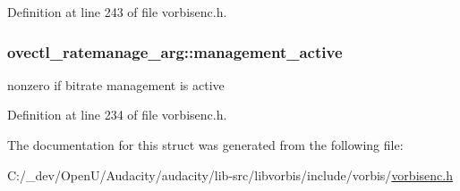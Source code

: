 Definition at line 243 of file vorbisenc.\+h.

\subsubsection[{\texorpdfstring{management\+\_\+active}{management_active}}]{ ovectl\+\_\+ratemanage\+\_\+arg\+::management\+\_\+active}\hypertarget{structovectl__ratemanage__arg_ad792d1b89a5d07f0f0e90509df4bc606}{}\label{structovectl__ratemanage__arg_ad792d1b89a5d07f0f0e90509df4bc606}
nonzero if bitrate management is active 

Definition at line 234 of file vorbisenc.\+h.



The documentation for this struct was generated from the following file\+:\begin{DoxyCompactItemize}
\item 
C\+:/\+\_\+dev/\+Open\+U/\+Audacity/audacity/lib-\/src/libvorbis/include/vorbis/\hyperlink{vorbisenc_8h}{vorbisenc.\+h}\end{DoxyCompactItemize}
